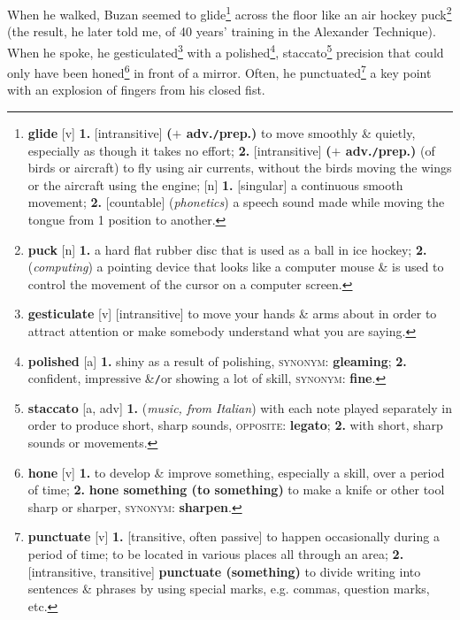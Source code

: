 \documentclass[oneside]{book}
\numberwithin{equation}{section}
\begin{document}
When he walked, Buzan seemed to glide\footnote{\textbf{glide} [v] \textbf{1.} [intransitive] \textbf{($+$ adv.\texttt{/}prep.)} to move smoothly \& quietly, especially as though it takes no effort; \textbf{2.} [intransitive] \textbf{($+$ adv.\texttt{/}prep.)} (of birds or aircraft) to fly using air currents, without the birds moving the wings or the aircraft using the engine; [n] \textbf{1.} [singular] a continuous smooth movement; \textbf{2.} [countable] (\textit{phonetics}) a speech sound made while moving the tongue from 1 position to another.} across the floor like an air hockey puck\footnote{\textbf{puck} [n] \textbf{1.} a hard flat rubber  disc that is used as a ball in ice hockey; \textbf{2.} (\textit{computing}) a pointing device that looks like a computer mouse \& is used to control the movement of the cursor on a computer screen.} (the result, he later told me, of 40 years' training in the Alexander Technique). When he spoke, he gesticulated\footnote{\textbf{gesticulate} [v] [intransitive] to move your hands \& arms about in order to attract attention or make somebody understand what you are saying.} with a polished\footnote{\textbf{polished} [a] \textbf{1.} shiny as a result of polishing, \textsc{synonym}: \textbf{gleaming}; \textbf{2.} confident, impressive \&\texttt{/}or showing a lot of skill, \textsc{synonym}: \textbf{fine}.}, staccato\footnote{\textbf{staccato} [a, adv] \textbf{1.} (\textit{music, from Italian}) with each note played separately in order to produce short, sharp sounds, \textsc{opposite}: \textbf{legato}; \textbf{2.} with short, sharp sounds or movements.} precision that could only have been honed\footnote{\textbf{hone} [v] \textbf{1.} to develop \& improve something, especially a skill, over a period of time; \textbf{2.} \textbf{hone something (to something)} to make a knife or other tool sharp or sharper, \textsc{synonym}: \textbf{sharpen}.} in front of a mirror. Often, he punctuated\footnote{\textbf{punctuate} [v] \textbf{1.} [transitive, often passive] to happen occasionally during a period of time; to be located in various places all through an area; \textbf{2.} [intransitive, transitive] \textbf{punctuate (something)} to divide writing into sentences \& phrases by using special marks, e.g. commas, question marks, etc.} a key point with an explosion of fingers from his closed fist.
\end{document}
